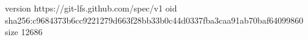version https://git-lfs.github.com/spec/v1
oid sha256:c9684373b6cc9221279d663f28bb33b0c44d0337fba3caa91ab70baf64099860
size 12686
